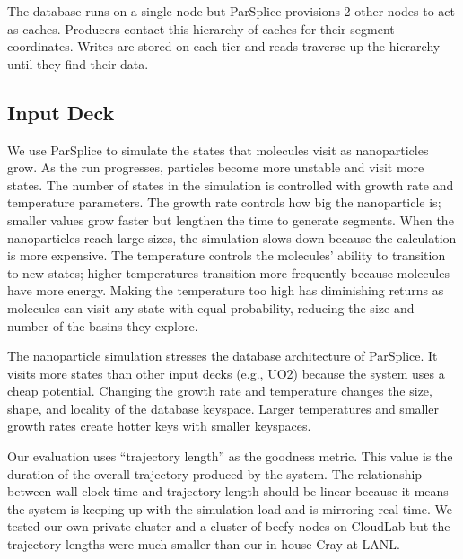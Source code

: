 The database runs on a single node but ParSplice provisions 2 other nodes to
act as caches. Producers contact this hierarchy of caches for their segment
coordinates.  Writes are stored on each tier and reads traverse up the
hierarchy until they find their data.

%
\subsection*{Input Deck}

We use ParSplice to simulate the states that molecules visit as nanoparticles
grow. As the run progresses, particles become more unstable and visit more
states.  The number of states in the simulation is controlled with growth rate
and temperature parameters. The growth rate controls how big the nanoparticle
is; smaller values grow faster but lengthen the time to generate segments. When
the nanoparticles reach large sizes, the simulation slows down because the
calculation is more expensive. The temperature controls the molecules' ability
to transition to new states; higher temperatures transition more frequently
because molecules have more energy.  Making the temperature too high has
diminishing returns as molecules can visit any state with equal probability,
reducing the size and number of the basins they explore.

The nanoparticle simulation stresses the database architecture of ParSplice. It
visits more states than other input decks ({e.g.}, UO2) because the system uses
a cheap potential. Changing the growth rate and temperature changes the size,
shape, and locality of the database keyspace. Larger temperatures and smaller
growth rates create hotter keys with smaller keyspaces.

Our evaluation uses ``trajectory length'' as the goodness metric. This value is
the duration of the overall trajectory produced by the system.  The
relationship between wall clock time and trajectory length should be linear
because it means the system is keeping up with the simulation load and is
mirroring real time. We tested our own private cluster and a cluster of beefy
nodes on CloudLab but the trajectory lengths were much smaller than our
in-house Cray at LANL. 

